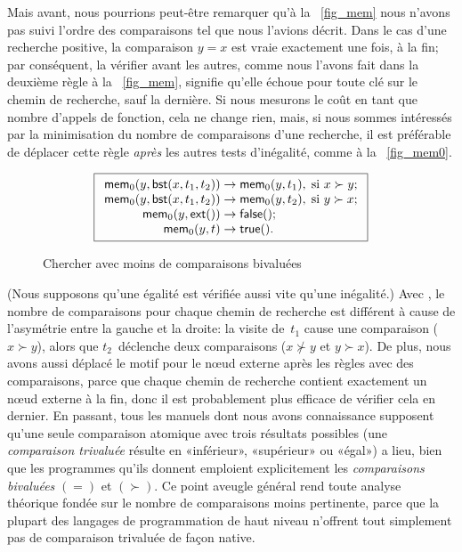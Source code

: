 Mais avant, nous pourrions peut-être remarquer qu'à la
\fig~\vref{fig_mem} nous n'avons pas suivi l'ordre des comparaisons
tel que nous l'avions décrit. Dans le cas d'une recherche positive, la
comparaison \(y = x\) est vraie exactement une fois, à la fin; par
conséquent, la vérifier avant les autres, comme nous l'avons fait dans
la deuxième règle à la \fig~\vref{fig_mem}, signifie qu'elle échoue
pour toute clé sur le chemin de recherche, sauf la dernière. Si nous
mesurons le coût en tant que nombre d'appels de fonction, cela ne
change rien, mais, si nous sommes intéressés par la minimisation du
nombre de comparaisons d'une recherche, il est préférable de déplacer
cette règle \emph{après} les autres tests d'inégalité, comme à la
\fig~\vref{fig_mem0}.
\begin{figure}
\begin{equation*}
\boxed{
\begin{array}{r@{\;}l@{\;}l}
\fun{mem}_0(y,\fun{bst}(x,t_1,t_2)) & \rightarrow & 
  \fun{mem}_0(y,t_1), \; \text{si \(x \succ y\)};\\
\fun{mem}_0(y,\fun{bst}(x,t_1,t_2)) & \rightarrow &
  \fun{mem}_0(y,t_2),\; \text{si \(y \succ x\)};\\
\fun{mem}_0(y,\fun{ext}()) & \rightarrow & \fun{false}();\\
\fun{mem}_0(y,t) & \rightarrow & \fun{true}().
\end{array}}
\end{equation*}
\caption{Chercher avec moins de comparaisons bivaluées\label{fig_mem0}}
\end{figure}
(Nous supposons qu'une égalité est vérifiée aussi vite qu'une
inégalité.) Avec , le
nombre de comparaisons pour chaque chemin de recherche est différent à
cause de l'asymétrie entre la gauche et la droite: la visite
de~\(t_1\) cause une comparaison (\(x \succ y\)), alors que
\(t_2\)~déclenche deux comparaisons (\(x \nsucc y\) et \(y \succ
x\)). De plus, nous avons aussi déplacé le motif pour le n{\oe}ud
externe après les règles avec des comparaisons, parce que chaque
chemin de recherche contient exactement un n{\oe}ud externe à la fin,
donc il est probablement plus efficace de vérifier cela en dernier. En
passant, tous les manuels dont nous avons connaissance supposent
qu'une seule comparaison atomique avec trois résultats possibles (une
\emph{comparaison trivaluée} résulte en «inférieur», «supérieur» ou
«égal») a lieu, bien que les programmes qu'ils donnent emploient
explicitement les \emph{comparaisons bivaluées} \((=)\) et
\((\succ)\). Ce point aveugle général rend toute analyse théorique
fondée sur le nombre de comparaisons moins pertinente, parce que la
plupart des langages de programmation de haut niveau n'offrent tout
simplement pas de comparaison trivaluée de façon native.

